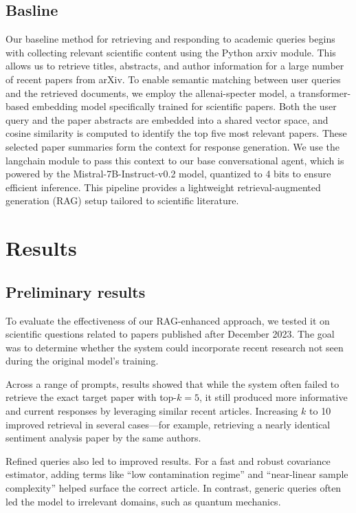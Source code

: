 \documentclass[fleqn,moreauthors,10pt]{ds_report}
\begin{document}
\subsection*{Basline}
Our baseline method for retrieving and responding to academic
 queries begins with collecting relevant scientific content using the 
 Python arxiv module. This allows us to retrieve titles, abstracts, and author
  information for a large number of recent papers from arXiv. To enable semantic
   matching between user queries and the retrieved documents, we employ the allenai-specter
    model, a transformer-based embedding model specifically trained for scientific papers.
     Both the user query and the paper abstracts are embedded into a shared vector space, 
     and cosine similarity is computed to identify the top five most relevant papers. 
     These selected paper summaries form the context for response generation. We use 
     the langchain module to pass this context to our base conversational agent, which
      is powered by the Mistral-7B-Instruct-v0.2 model, quantized to 4 bits to ensure 
      efficient inference. This pipeline provides a lightweight
       retrieval-augmented generation (RAG) setup tailored to scientific literature.

\section*{Results}
\subsection*{Preliminary results }
To evaluate the effectiveness of our RAG-enhanced approach, we tested it on scientific
 questions related to papers published after December 2023. The goal was to determine 
 whether the system could incorporate recent research not seen during the original
  model’s training.

Across a range of prompts, results showed that while the system often failed to retrieve 
the exact target paper with top-$k=5$, it still produced more informative and current responses by leveraging similar recent articles. Increasing $k$ to 10 improved retrieval in several cases—for example, retrieving a nearly identical sentiment analysis paper by the same authors.

Refined queries also led to improved results. For a fast and robust covariance estimator, adding terms like “low contamination regime” and “near-linear sample complexity” helped surface the correct article. In contrast, generic queries often led the model to irrelevant domains, such as quantum mechanics.
\end{document}
